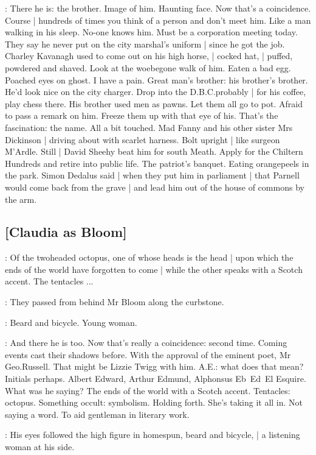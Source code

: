 \BloomInt:
There he is:
the brother.
Image of him.
Haunting face.
Now that's a coincidence.
Course |
hundreds of times you think of a person and don't meet him.
Like a man walking in his sleep.
No-one knows him.
Must be a corporation meeting today.
They say he never put on the city marshal's uniform |
since he got the job.
Charley Kavanagh used to come out on his high horse, |
cocked hat, |
puffed, powdered and shaved.
Look at the woebegone walk of him.
Eaten a bad egg.
Poached eyes on ghost.
I have a pain.
Great man's brother:
his brother's brother.
He'd look nice on the city charger.
Drop into the D.B.C.\@ probably |
for his coffee,
play chess there.
His brother used men as pawns.
Let them all go to pot.
Afraid to pass a remark on him.
Freeze them up with that eye of his.
That's the fascination:
the name.
All a bit touched.
Mad Fanny and his other sister Mrs Dickinson |
driving about with scarlet harness.
Bolt upright |
like surgeon M'Ardle.
Still |
David Sheehy beat him for south Meath.
Apply for the Chiltern Hundreds and retire into public life.
The patriot's banquet.
Eating orangepeels in the park.
Simon Dedalus said |
when they put him in parliament |
that Parnell would come back from the grave |
and lead him out of the house of commons by the arm.

\subsection{[Claudia as Bloom]}

\AErussell:
Of the twoheaded octopus,
one of whose heads is the head |
upon which the ends of the world have forgotten to come |
while the other speaks with a Scotch accent.
The tentacles ...

:
They passed from behind Mr Bloom along the curbstone.

\BloomInt:
Beard and bicycle.
Young woman.

\BloomInt:
And there he is too.
Now that's really a coincidence:
second time.
Coming events cast their shadows before.
With the approval of the eminent poet,
Mr Geo.\@ Russell.
That might be Lizzie Twigg with him.
A.E.:
what does that mean?
Initials perhaps.
Albert Edward,
Arthur Edmund,
Alphonsus Eb~Ed~El Esquire.
What was he saying?
The ends of the world with a Scotch accent.
Tentacles:
octopus.
Something occult:
symbolism.
Holding forth.
She's taking it all in.
Not saying a word.
To aid gentleman in literary work.

:
His eyes followed the high figure in homespun,
beard and bicycle, |
a listening woman at his side.

